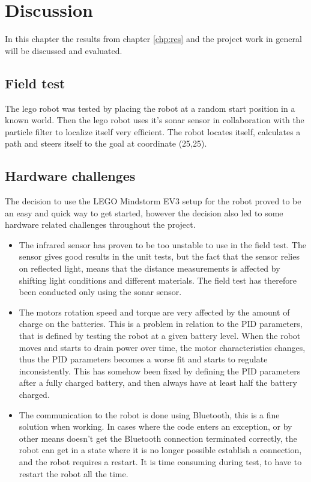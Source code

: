 \chapter{Discussion}
\label{chp:disc}
In this chapter the results from chapter \ref{chp:res} and the project work in general will be discussed and evaluated.

\section{Field test}
The lego robot was tested by placing the robot at a random start position in a known world. Then the lego robot uses it's sonar sensor in collaboration with the particle filter to localize itself very efficient. The robot locates itself, calculates a path and steers itself to the goal at coordinate (25,25). 

\section{Hardware challenges}
The decision to use the LEGO Mindstorm EV3 setup for the robot proved to be an easy and quick way to get started, however the decision also led to some hardware related challenges throughout the project.

\begin{itemize}
	\item The infrared sensor has proven to be too unstable to use in the field test.
	The sensor gives good results in the unit tests, but the fact that the sensor relies on reflected light, means that the distance measurements is affected by shifting light conditions and different materials.
	The field test has therefore been conducted only using the sonar sensor.
	\item The motors rotation speed and torque are very affected by the amount of charge on the batteries.
	This is a problem in relation to the PID parameters, that is defined by testing the robot at a given battery level.
	When the robot moves and starts to drain power over time, the motor characteristics changes, thus the PID parameters becomes a worse fit and starts to regulate inconsistently.
	This has somehow been fixed by defining the PID parameters after a fully charged battery, and then always have at least half the battery charged.
	\item The communication to the robot is done using Bluetooth, this is a fine solution when working.
	In cases where the code enters an exception, or by other means doesn't get the Bluetooth connection terminated correctly, the robot can get in a state where it is no longer possible establish a connection, and the robot requires a restart.
	It is time consuming during test, to have to restart the robot all the time.
\end{itemize}

